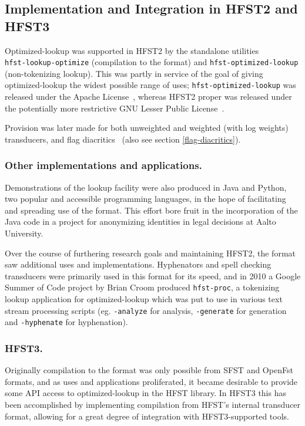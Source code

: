 \documentclass{llncs}
\begin{document}
\subsection{Implementation and Integration in HFST2 and HFST3}
Optimized-lookup was supported in HFST2 by the standalone utilities\\
\verb+hfst-lookup-optimize+ (compilation to the format) and
\verb+hfst-optimized-lookup+ (non-tokenizing lookup). This was partly
in service of the goal of giving optimized-lookup the widest possible range
of uses; \verb+hfst-optimized-lookup+ was released under the
Apache License~\cite{apache-license}, whereas HFST2 proper was released
under the potentially more restrictive GNU Lesser Public
License~\cite{lgpl-license}.

Provision was later made for both unweighted and weighted (with log weights)
transducers, and flag diacritics~\cite{beesley/2003} (also see section
\ref{flag-diacritics}).

\subsubsection{Other implementations and applications.}
Demonstrations of the lookup facility were also
produced in Java and Python, two popular and accessible programming languages,
in the hope of facilitating and spreading use of the format. This effort
bore fruit in the incorporation of the Java code in a project for anonymizing
identities in legal decisions at Aalto University.

Over the course of furthering research goals and maintaining HFST2,
the format saw additional uses and implementations. Hyphenators and spell
checking transducers were primarily used in this format for its speed, and
in 2010 a Google Summer of Code project by Brian Croom produced
\verb+hfst-proc+, a tokenizing lookup application for optimized-lookup which
was put to use in various text stream processing scripts (eg.
\verb+-analyze+ for analysis, \verb+-generate+ for generation and
\verb+-hyphenate+ for hyphenation).

\subsubsection{HFST3.}
Originally compilation to the format was only possible from SFST and OpenFst
formats, and as uses and applications proliferated, it became desirable to
provide some API access to optimized-lookup in the HFST library. In HFST3
this has been accomplished by implementing compilation from HFST's internal
transducer format, allowing for a great degree of integration with
HFST3-supported tools.
\end{document}
